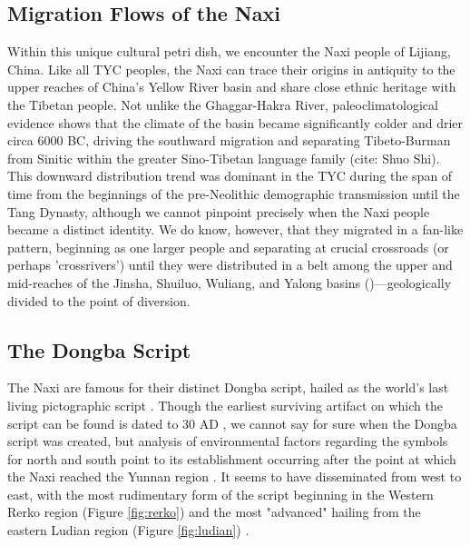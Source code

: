 \documentclass[11pt,a4paper,oneside]{report}
\begin{document}
\subsection{Migration Flows of the Naxi}
\noindent\hspace{1cm}
Within this unique cultural petri dish, we encounter the Naxi people of Lijiang, China. Like all TYC peoples, the Naxi can trace their origins in antiquity to the upper reaches of China's Yellow River basin and share close ethnic heritage with the Tibetan people\cite{yang_study_2024, he_gao_2017}. Not unlike the Ghaggar-Hakra River, paleoclimatological evidence shows that the climate of the basin became significantly colder and drier circa 6000 BC, driving the southward migration and separating Tibeto-Burman from Sinitic within the greater Sino-Tibetan language family (cite: Shuo Shi). This downward distribution trend was dominant in the TYC during the span of time from the beginnings of the pre-Neolithic demographic transmission until the Tang Dynasty, although we cannot pinpoint precisely when the Naxi people became a distinct identity. We do know, however, that they migrated in a fan-like pattern, beginning as one larger people and separating at crucial crossroads (or perhaps 'crossrivers') until they were distributed in a belt among the upper and mid-reaches of the Jinsha, Shuiluo, Wuliang, and Yalong basins (\cite{yang_study_2024})—geologically divided to the point of diversion.

\subsection{The Dongba Script}
\noindent\hspace{1cm}
The Naxi are famous for their distinct Dongba script, hailed as the world's last living pictographic script \cite{nishida_living_1966}. Though the earliest surviving artifact on which the script can be found is dated to 30 AD \cite{kleo_treasures_nodate}, we cannot say for sure when the Dongba script was created, but analysis of environmental factors regarding the symbols for north and south point to its establishment occurring after the point at which the Naxi reached the Yunnan region \cite{li_dictionary_1944, zhang_tibetan-yi_2022}. It seems to have disseminated from west to east, with the most rudimentary form of the script beginning in the Western Rerko region (Figure \ref{fig:rerko}) and the most "advanced" hailing from the eastern Ludian region (Figure \ref{fig:ludian}) \cite{wang_developments_2001}. 
\end{document}
